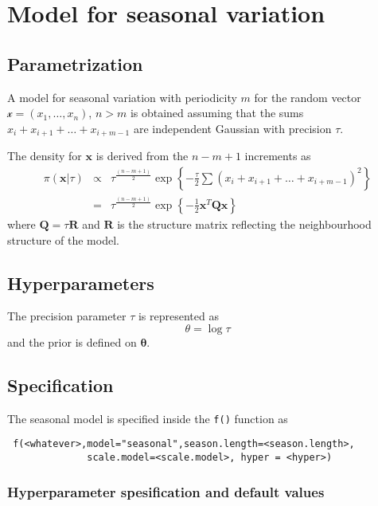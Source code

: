 \documentclass[a4paper,11pt]{article}
\begin{document}
\section*{Model for seasonal variation}

\subsection*{Parametrization}

A model for seasonal variation with periodicity $m$ for the random
vector $\mathcal{x}=(x_1,\dots,x_n)$, $n>m$ is obtained assuming that
the sums $x_i+x_{i+1}+\dots+x_{i+m-1}$ are independent Gaussian with
precision $\tau$.

The density for $\mathbf{x}$ is derived from the $n-m+1$ increments as
\begin{eqnarray}
    \pi(\mathbf{x}|\tau) &\propto& \tau^{\frac{(n-m+1)}{2}} \exp\left\{-\frac{\tau}{2}\sum (x_i+x_{i+1}+\dots+x_{i+m-1})^2\right\}\\
    & = &\tau^{\frac{(n-m+1)}{2}}\exp\left\{-\frac{1}{2}\mathbf{x}^T\mathbf{Q}\mathbf{x} \right\}
\end{eqnarray}
where $\mathbf{Q}=\tau\mathbf{R}$ and $\mathbf{R}$ is the structure
matrix reflecting the neighbourhood structure of the model.


\subsection*{Hyperparameters}

The precision parameter $\tau$ is represented as
\begin{displaymath}
    \theta =\log \tau
\end{displaymath}
and the prior is defined on $\mathbf{\theta}$. 

\subsection*{Specification}

The seasonal model is specified inside the {\tt f()} function as
\begin{verbatim}
 f(<whatever>,model="seasonal",season.length=<season.length>,
              scale.model=<scale.model>, hyper = <hyper>)
\end{verbatim}

\subsubsection*{Hyperparameter spesification and default values}

\end{document}
